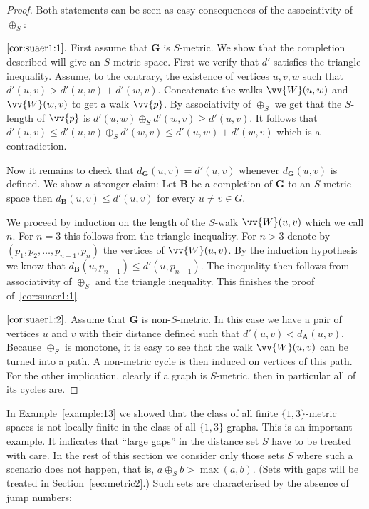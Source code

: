 \documentclass{elsarticle}
\def\str#1{\mathbf {#1}}
\theoremstyle{plain}
\theoremstyle{definition}
\theoremstyle{remark}
\begin{document}
\begin{proof}
Both statements can be seen as easy consequences of the associativity of $\oplus_S$:

\medskip

$\it \ref{cor:suaer1:1}.$ 
First assume that $\str{G}$ is $S$-metric. We show that the completion
described will give an $S$-metric space.
  First we verify that $d'$ satisfies the triangle inequality. Assume, to the contrary, the existence of
vertices $u,v,w$ such that $d'(u,v)> d'(u,w)+d'(w,v)$. Concatenate the walks
$\vv{W}(u,w)$ and $\vv{W}(w,v)$ to get a walk $\vv{p}$. By associativity of $\oplus_S$ we get that the $S$-length of $\vv{p}$
is $d'(u,w)\oplus_S d'(w,v)\geq d'(u,v)$. It follows that $d'(u,v)\leq d'(u,w)\oplus_S d'(w,v)\leq d'(u,w)+d'(w,v)$ which is a contradiction.

Now it remains to check that $d_\str{G}(u,v)=d'(u,v)$ whenever $d_\str{G}(u,v)$ is defined.
 We show a stronger claim: Let $\str{B}$ be a completion of $\str{G}$ to an $S$-metric space
then $d_\str{B}(u,v)\leq d'(u,v)$ for every $u\neq v\in G$.

We proceed by induction on the length of the $S$-walk $\vv{W}(u,v)$ which we call $n$.  For $n=3$ this follows from the triangle
inequality.  For $n>3$ denote by $(p_1,p_2,\ldots ,p_{n-1},p_n)$ the vertices of $\vv{W}(u,v)$.
By the induction hypothesis we know that $d_\str{B}(u,p_{n-1})\leq d'(u,p_{n-1})$.
The inequality then follows from associativity of $\oplus_S$ and the
triangle inequality. This finishes the proof of~\ref{cor:suaer1:1}.

\medskip

$\it \ref{cor:suaer1:2}.$
Assume that $\str{G}$ is non-$S$-metric.  In this case we have a pair of vertices
$u$ and $v$ with their distance defined such that $d'(u,v) < d_\str{A}(u,v)$. Because $\oplus_S$ is monotone,
it is easy to see that the walk $\vv{W}(u,v)$ can be turned into a path. A non-metric
cycle is then induced on vertices of this path. For the other implication, clearly if a graph is $S$-metric, then in particular all of its cycles are.
\end{proof}


In Example~\ref{example:13} we showed that the class of all finite $\{1,3\}$-metric spaces is not locally finite in the class of all $\{1,3\}$-graphs.
This is an important example. It indicates that ``large gaps'' in the distance set $S$ have to be treated with care. In the rest of this section we consider 
only those sets $S$ where such a scenario does not happen, that is, $a\oplus_S b > \max(a,b)$.
(Sets with gaps will be treated in Section~\ref{sec:metric2}.)
Such sets are characterised by the absence of jump numbers:
\end{document}
